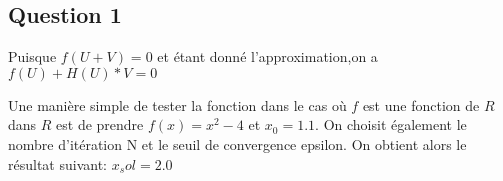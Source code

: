 \subsection {Question 1} 
Puisque $f(U+V)=0$ et étant donné l'approximation,on a
\newline
 $f(U)+H(U)*V=0$


Une manière simple de tester la fonction dans le cas où $f$ est une fonction de $R$ dans $R$ est de prendre $f(x)=x^2-4$ et $x_0=1.1$. On choisit également le nombre d'itération N et le seuil de convergence epsilon. On obtient alors le résultat suivant:
\newline
$x_sol=2.0$